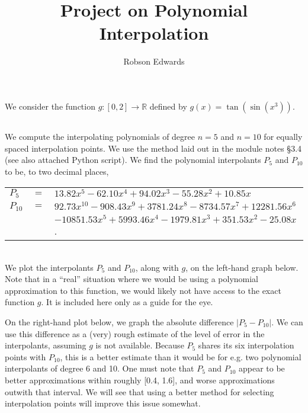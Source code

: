 \documentclass[11pt, oneside]{article}
\title{Project on Polynomial Interpolation}
\author{Robson Edwards}
\begin{document}
\maketitle

\section{}

We consider the function $g: [0, 2] \rightarrow \mathbb{R}$ defined by
$g(x) = \tan(\sin(x^3))$.

\subsection{}

We compute the interpolating polynomials of degree $n = 5$ and $n = 10$ for equally spaced interpolation points. We use the method laid out in the module notes \S 3.4 (see also attached Python script). We find the polynomial interpolants $P_5$ and $P_{10}$ to be, to two decimal places,
\\

\begin{tabular}{l c l}
$P_5$ & $=$ & $13.82x^5 -62.10x^4 + 94.02x^3 -55.28x^2 + 10.85x$ \\
$P_{10}$ & $=$ &
$92.73x^{10} -908.43x^9 + 3781.24x^8 -8734.57x^7 + 12281.56x^6$ \\
& & $-10851.53x^5 + 5993.46x^4 -1979.81x^3 + 351.53x^2  -25.08x  $.
\end{tabular}
\\
\flushleft
We plot the interpolants $P_5$ and $P_{10}$, along with $g$, on the left-hand graph below. Note that in a ``real'' situation where we would be using a polynomial approximation to this function, we would likely not have access to the exact function $g$. It is included here only as a guide for the eye. 

On the right-hand plot below, we graph the absolute difference $|P_5-P_{10}|$. We can use this difference as a (very) rough estimate of the level of error in the interpolants, assuming $g$ is not available. Because $P_5$ shares its six interpolation points with $P_{10}$, this is a better estimate than it would be for e.g. two polynomial interpolants of degree 6 and 10. One must note that $P_5$ and $P_{10}$ appear to be better approximations within roughly [0.4, 1.6], and worse approximations outwith that interval. We will see that using a better method for selecting interpolation points will improve this issue somewhat. 
\end{document}
